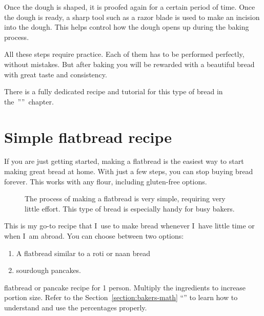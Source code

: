 Once the dough is shaped, it is proofed again for a certain
period of time. Once the dough is ready, a sharp tool such
as a razor blade is used to make an incision into the dough.
This helps control how the dough opens up during the baking process.

All these steps require practice. Each of them has to be
performed perfectly, without mistakes.
But after baking you will be rewarded with a beautiful bread
with great taste and consistency.

There is a fully dedicated recipe and tutorial
for this type of bread in the~''''~chapter.

\section{Simple flatbread recipe}%
\label{section:flat-bread-recipe}

If you are just getting started, making a flatbread is the
easiest way to start making great bread at home. With just a
few steps, you can stop buying bread forever. This works with
any flour, including gluten-free options.

\begin{figure}[!htb]
\begin{center}
  
  \caption{The process of making a flatbread is very simple, requiring very little effort. This
  type of bread is especially handy for busy bakers.}%
  \label{fig:flat-bread-process}
\end{center}
\end{figure}

This is my go-to recipe that I~use to make bread whenever
I~have little time or when I~am abroad. You can choose
between two options:
%
\begin{enumerate}
    \item A flatbread similar to a roti or naan bread
    \item sourdough pancakes.
\end{enumerate}

\begin{table}[!htb]
    \begin{center}
        
        \caption{\label{tab:flat-bread-ingredients}flatbread or pancake recipe
            for 1 person. Multiply the ingredients to increase portion size.
            Refer to the Section~\ref{section:bakers-math}
            ``'' to learn how to understand and
            use the percentages properly.}
    \end{center}
\end{table}

